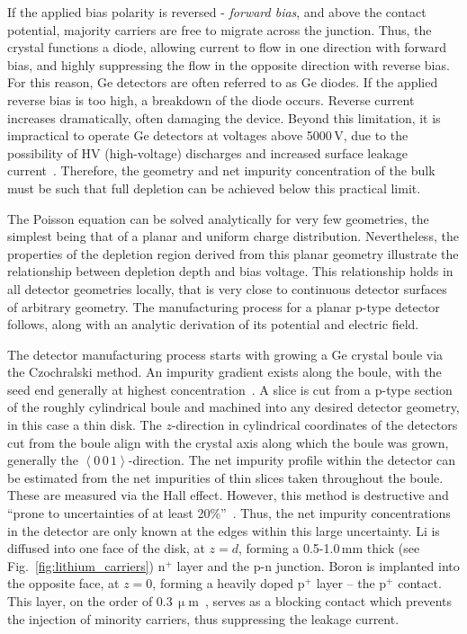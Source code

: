 If the applied bias polarity is reversed - \textit{forward bias}, and above the contact potential, majority carriers are free to migrate across the junction. Thus, the crystal functions a diode, allowing current to flow in one direction with forward bias, and highly suppressing the flow in the opposite direction with reverse bias. For this reason, Ge detectors are often referred to as Ge diodes. If the applied reverse bias is too high, a breakdown of the diode occurs. Reverse current increases dramatically, often damaging the device. Beyond this limitation, it is impractical to operate Ge detectors at voltages above 5000\,V, due to the possibility of HV (high-voltage) discharges and increased surface leakage current~\cite{knoll}. Therefore, the geometry and net impurity concentration of the bulk must be such that full depletion can be achieved below this practical limit. 

The Poisson equation can be solved analytically for very few geometries, the simplest being that of a planar and uniform charge distribution. Nevertheless, the properties of the depletion region derived from this planar geometry illustrate the relationship between depletion depth and bias voltage. This relationship holds in all detector geometries locally, that is very close to continuous detector surfaces of arbitrary geometry. The manufacturing process for a planar p-type detector follows, along with an analytic derivation of its potential and electric field.

The detector manufacturing process starts with growing a Ge crystal boule via the Czochralski method. An impurity gradient exists along the boule, with the seed end generally at highest concentration~\cite{gefica}. A slice is cut from a p-type section of the roughly cylindrical boule and machined into any desired detector geometry, in this case a thin disk. The $z$-direction in cylindrical coordinates of the detectors cut from the boule align with the crystal axis along which the boule was grown, generally the $\left<0\,0\,1\right>$-direction. The net impurity profile within the detector can be estimated from the net impurities of thin slices taken throughout the boule. These are measured via the Hall effect. However, this method is destructive and ``prone to uncertainties of at least 20\%''~\cite{low_conc_dets}. Thus, the net impurity concentrations in the detector are only known at the edges within this large uncertainty. Li is diffused into one face of the disk, at $z = d$, forming a 0.5-1.0\,mm thick (see Fig.~\ref{fig:lithium_carriers}) n$^+$ layer and the p-n junction. Boron is implanted into the opposite face, at $z = 0$, forming a heavily doped p$^+$ layer -- the p$^+$ contact. This layer, on the order of 0.3\,$\upmu$m~\cite{boron}, serves as a blocking contact which prevents the injection of minority carriers, thus suppressing the leakage current. 

